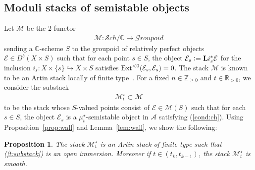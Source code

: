 \documentclass[11pt]{amsart}
\theoremstyle{plain}
\newtheorem{prop}[thm]{Proposition}
\newcommand{\aA}{\mathcal{A}}
\newcommand{\eE}{\mathcal{E}}
\newcommand{\gG}{\mathcal{G}}
\newcommand{\mM}{\mathcal{M}}
\newcommand{\sS}{\mathcal{S}}
\newcommand{\dL}{\mathbf{L}}
\newcommand{\Ext}{\mathop{\rm Ext}\nolimits}
\begin{document}
\subsection{Moduli stacks of semistable objects}
Let $\mM$ be 
the 2-functor
\begin{align*}
\mM \colon \sS ch/\mathbb{C} \to \gG roupoid
\end{align*}
sending a $\mathbb{C}$-scheme $S$ to 
the groupoid of relatively perfect objects 
$\eE \in D^b(X \times S)$ such that 
for each point $s \in S$, 
the object $\eE_s \cneq \dL i_s^{\ast}\eE$
for the inclusion 
$i_s \colon X \times \{s\} \hookrightarrow X \times S$
satisfies 
$\Ext^{<0}(\eE_s, \eE_s)=0$. 
The stack $\mM$ is known to be an 
Artin stack locally of finite type~\cite{LIE}. 
For a fixed $n \in \mathbb{Z}_{\ge 0}$
and $t \in \mathbb{R}_{>0}$, 
we consider the substack 
\begin{align}\label{t:substack}
\mM_t^{\star} \subset \mM
\end{align}
to be 
the stack 
whose $S$-valued points
consist
of $\eE \in \mM(S)$
such that 
for each $s \in S$, the object 
$\eE_s$ is a
$\mu_t^{\star}$-semistable object in 
$\aA$ satisfying (\ref{cond:ch}). 
Using Proposition~\ref{prop:wall} and Lemma~\ref{lem:wall}, 
we show the following: 
\begin{prop}\label{prop:stack}
The stack $\mM_t^{\star}$ is an Artin stack of finite type 
such that (\ref{t:substack}) is an open immersion. 
Moreover if $t\in (t_k, t_{k-1})$, the stack 
$\mM_t^{\star}$ is smooth. 
\end{prop}
\end{document}
